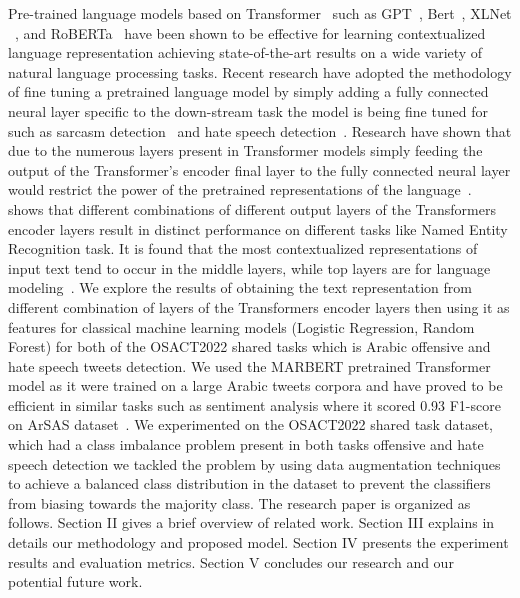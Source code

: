 \documentclass[conference]{IEEEtran}
\begin{document}
Pre-trained language models based on Transformer~\cite{vaswani2017attention} such as GPT~\cite{radford2018improving}, Bert~\cite{devlin2018bert}, XLNet ~\cite{yang2019deepening}, and RoBERTa~\cite{zhuang2021robustly} have been shown to be effective for learning contextualized language representation achieving state-of-the-art results on a wide variety of natural language processing tasks.
Recent research have adopted the methodology of fine tuning a pretrained language model by simply adding a fully connected neural layer specific to the down-stream task the model is being fine tuned for such as sarcasm detection~\cite{farha2021benchmarking} and hate speech detection~\cite{aldjanabi2021arabic}. Research have shown that due to the numerous layers present in Transformer models simply feeding the output of the Transformer’s encoder final layer to the fully connected neural layer would restrict the power of the pretrained representations of the language~\cite{yang2019deepening}.~\cite{devlin2018bert} shows that different combinations of different output layers of the Transformers encoder layers result in distinct performance on different tasks like Named Entity Recognition task. It is found that the most contextualized representations of input text tend to occur in the middle layers, while top layers are for language modeling~\cite{yang2019deepening}. We explore the results of obtaining the text representation from different combination of layers of the Transformers encoder layers then using it as features for classical machine learning models (Logistic Regression, Random Forest) for both of the OSACT2022 shared tasks which is Arabic offensive and hate speech tweets detection. We used the MARBERT pretrained Transformer model as it were trained on a large Arabic tweets corpora and have proved to be efficient in similar tasks such as sentiment analysis where it scored 0.93 F1-score on ArSAS dataset~\cite{abdul-mageed-etal-2021-arbert}. We experimented on the OSACT2022 shared task dataset, which had a class imbalance problem present in both tasks offensive and hate speech detection we tackled the problem by using data augmentation techniques to achieve a balanced class distribution in the dataset to prevent the classifiers from biasing towards the majority class. The research paper is organized as follows. Section II gives a brief overview of related work. Section III explains in details our methodology and proposed model. Section IV presents the experiment results  and evaluation metrics. Section V concludes our research and our potential future work.
\end{document}
